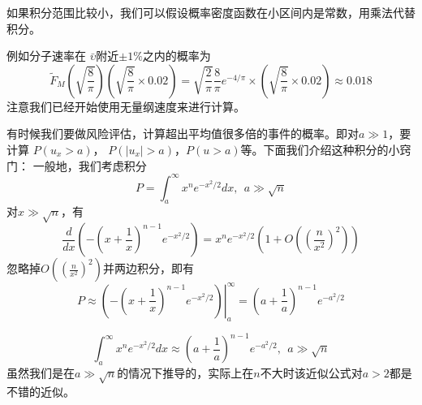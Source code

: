\documentclass[CJK]{beamer}
\begin{document}
\begin{frame}
\bch
{}
\emini
{}
\emini
\ech
\end{frame}

\begin{frame}
\bch
{\small
如果积分范围比较小，我们可以假设概率密度函数在小区间内是常数，用乘法代替积分。

\skipline

例如分子速率在 $\bar{\upsilon}$附近$\pm 1\%$之内的概率为
$$ \tilde{F}_M(\sqrt{\frac{8}{\pi}}) (\sqrt{\frac{8}{\pi}} \times 0.02) =\sqrt{\frac{2}{\pi}} \frac{8}{\pi}e^{-4/\pi} \times\left(\sqrt{\frac{8}{\pi}}\times 0.02 \right) \approx 0.018  $$
注意我们已经开始使用无量纲速度来进行计算。
}
\ech
\end{frame}


\begin{frame}
\bch
{}
\emini
{}
\emini
\ech
\end{frame}

\begin{frame}
\bch
{\scriptsize
有时候我们要做风险评估，计算超出平均值很多倍的事件的概率。即对$a\gg 1$，要计算
$P(u_x >a)$， $P(|u_x|>a)$，$P(u>a)$等。下面我们介绍这种积分的小窍门：
一般地，我们考虑积分
$$P = \int_a^\infty x^n e^{-x^2/2}dx,  \ \ a\gg \sqrt{n} $$
对$x\gg \sqrt{n}$，有
$$\frac{d}{dx} \left(-\left(x+\frac{1}{x}\right)^{n-1}e^{-x^2/2}\right) = x^n e^{-x^2/2}\left(1+O\left(\left(\frac{n}{x^2}\right)^2\right)\right)$$
忽略掉$O\left(\left(\frac{n}{x^2}\right)^2\right)$并两边积分，即有
$$P \approx \left.\left(-\left(x+\frac{1}{x}\right)^{n-1}e^{-x^2/2}\right)\right\vert_{a}^\infty = \left(a+\frac{1}{a}\right)^{n-1}e^{-a^2/2}$$
}
\ech
\end{frame}

\begin{frame}
\bch
{\blue
$$ \int_a^\infty x^n e^{-x^2/2}dx \approx  \left(a+\frac{1}{a}\right)^{n-1}e^{-a^2/2}, \ \ a\gg \sqrt{n}$$
}
虽然我们是在$a\gg \sqrt{n}$的情况下推导的，实际上在{\blue $n$不大时该近似公式对$a>2$都是不错的近似}。
\ech
\end{frame}
\end{document}
